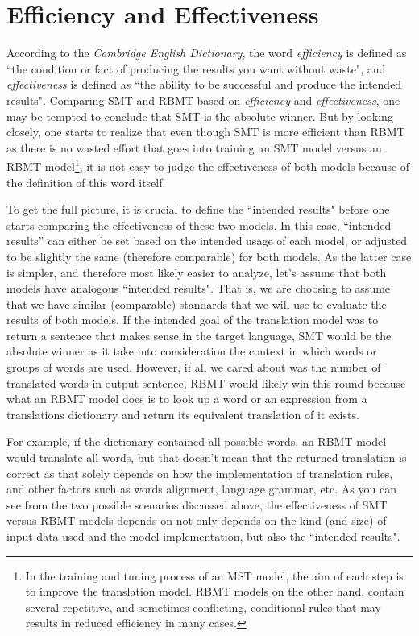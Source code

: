 \section{Efficiency and Effectiveness}
According to the \textit{Cambridge English Dictionary}, the word \textit{efficiency} is defined as ``the condition or fact of producing the results you want without waste"\cite{cambridgeefficiency}, and \textit{effectiveness} is defined as ``the ability to be successful and produce the intended results"\cite{cambridgeeffectiveness}. Comparing SMT and RBMT based on \textit{efficiency} and \textit{effectiveness}, one may be tempted to conclude that SMT is the absolute winner. But by looking closely, one starts to realize that even though SMT is more efficient than RBMT as there is no wasted effort that goes into training an SMT model versus an RBMT model\footnote{In the training and tuning process of an MST model, the aim of each step is to improve the translation model. RBMT models on the other hand, contain several repetitive, and sometimes conflicting, conditional rules that may results in reduced efficiency in many cases.}, it is not easy to judge the effectiveness of both models because of the definition of this word itself. 

To get the full picture, it is crucial to define the ``intended results" before one starts comparing the effectiveness of these two models.  In this case, “intended results” can either be set based on the intended usage of each model, or adjusted to be slightly the same (therefore comparable) for both models. As the latter case is simpler, and therefore most likely easier to analyze, let's assume that both models have analogous ``intended results". That is, we are choosing to assume that we have similar (comparable) standards that we will use to evaluate the results of both models. If the intended goal of the translation model was to return a sentence that makes sense in the target language, SMT would be the absolute winner as it take into consideration the context in which words or groups of words are used. However, if all we cared about was the number of translated words in output sentence, RBMT would likely win this round because what an RBMT model does is to look up a word or an expression from a translations dictionary and return its equivalent translation of it exists. 

For example, if the dictionary contained all possible words, an RBMT model would translate all words, but that doesn't mean that the returned translation is correct as that solely depends on how the implementation of translation rules, and other factors such as words alignment, language grammar, etc. As you can see from the two possible scenarios discussed above, the effectiveness of SMT versus RBMT models depends on not only depends on the kind (and size) of input data used and the model implementation, but also the ``intended results".

